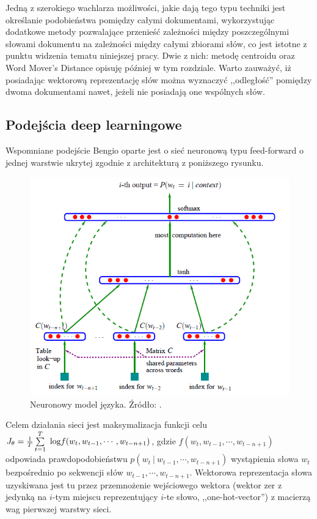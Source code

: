 \documentclass[pl]{minipw} %
\begin{document}
Jedną z szerokiego wachlarza możliwości, jakie dają tego typu techniki jest określanie podobieństwa pomiędzy całymi dokumentami, wykorzystując dodatkowe metody pozwalające przenieść zależności między poszczególnymi słowami dokumentu na zależności między całymi zbiorami słów, co jest istotne z punktu widzenia tematu niniejszej pracy. Dwie z nich: metodę centroidu oraz Word Mover's Distance opisuję później w tym rozdziale. Warto zauważyć, iż posiadając wektorową reprezentację słów można wyznaczyć ,,odległość'' pomiędzy dwoma dokumentami nawet, jeżeli nie posiadają one wspólnych słów.


\subsection{Podejścia deep learningowe}

Wspomniane podejście Bengio oparte jest o sieć neuronową typu feed-forward o jednej warstwie ukrytej zgodnie z architekturą z poniższego rysunku.

\begin{figure}[H]
	\centering
	\includegraphics[width=1\textwidth]{img/bengio_language_model.png}
	\caption{Neuronowy model języka. Źródło: \cite{bengio}.}
\end{figure}

Celem działania sieci jest maksymalizacja funkcji celu $J_\theta = \frac{1}{T}\sum\limits_{t=1}^T\ \text{log} \space f(w_t , w_{t-1} , \cdots , w_{t-n+1})$, gdzie $f(w_t , w_{t-1} , \cdots , w_{t-n+1})$ odpowiada prawdopodobieństwu $p(w_t \: | \: w_{t-1} , \cdots , w_{t-n+1})$ wystąpienia słowa $w_t$ bezpośrednio po sekwencji słów $w_{t-1} , \cdots , w_{t-n+1}$. Wektorowa reprezentacja słowa uzyskiwana jest tu przez przemnożenie wejściowego wektora (wektor zer z jedynką na $i$-tym miejscu reprezentujący $i$-te słowo, ,,one-hot-vector'') z macierzą wag pierwszej warstwy sieci.
\end{document}
